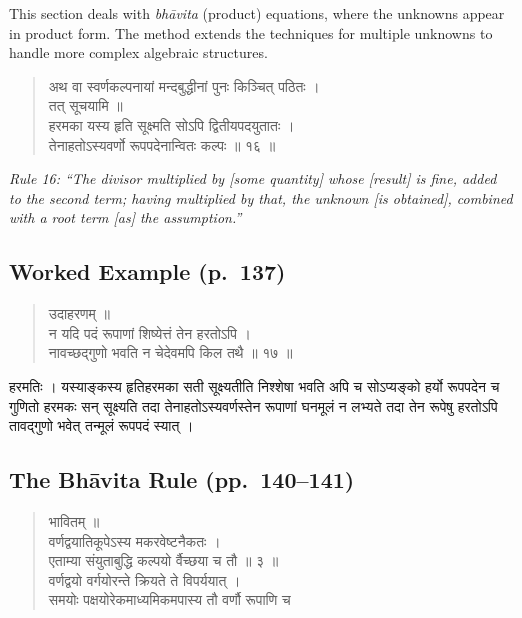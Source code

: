 \documentclass[11pt,a4paper]{article}
\newcommand{\cnote}[1]{\textcolor{notecolor}{\textit{#1}}}
\newcommand{\dev}[1]{{\devanagarifont #1}}
\newenvironment{sanskritverse}{%
  \begin{verse}
}{%
  \end{verse}
}
\begin{document}
This section deals with \textit{bhāvita} (product) equations, where the unknowns appear in product form. The method extends the techniques for multiple unknowns to handle more complex algebraic structures.

\begin{sanskritverse}
\dev{%
अथ वा स्वर्णकल्पनायां मन्दबुद्धीनां पुनः किञ्चित् पठितः ।\\
तत् सूचयामि ॥\\[0.5em]
हरमका यस्य हृति सूक्ष्मति सोऽपि द्वितीयपदयुतातः ।\\
तेनाहतोऽस्यवर्णो रूपपदेनान्वितः कल्पः ॥ १६ ॥}
\end{sanskritverse}

\cnote{Rule 16: ``The divisor multiplied by [some quantity] whose [result] is fine, added to the second term; having multiplied by that, the unknown [is obtained], combined with a root term [as] the assumption.''}

\subsection*{Worked Example (p.\ 137)}

\begin{sanskritverse}
\dev{%
उदाहरणम् ॥\\[0.3em]
न यदि पदं रूपाणां शिष्येत्तं तेन हरतोऽपि ।\\
नावच्छद्‌गुणो भवति न चेदेवमपि किल तथै ॥ १७ ॥}
\end{sanskritverse}

\dev{%
हरमतिः । यस्याङ्कस्य हृतिहरमका सती सूक्ष्यतीति निश्शेषा भवति अपि च सोऽप्यङ्को हर्यो रूपपदेन च गुणितो हरमकः सन् सूक्ष्यति तदा तेनाहतोऽस्यवर्णस्तेन रूपाणां घनमूलं न लभ्यते तदा तेन रूपेषु हरतोऽपि तावद्‌गुणो भवेत् तन्मूलं रूपपदं स्यात् ।}

\subsection{The Bhāvita Rule (pp.\ 140--141)}

\begin{sanskritverse}
\dev{%
भावितम् ॥\\[0.5em]
वर्णद्वयातिकूपेऽस्य मकरवेष्टनैकतः ।\\
एताम्या संयुताबुद्धि कल्पयो र्वैच्छया च तौ ॥ ३ ॥\\[0.5em]
वर्णद्वयो वर्गयोरन्ते क्रियते ते विपर्ययात् ।\\
समयोः पक्षयोरेकमाध्यमिकमपास्य तौ वर्णौ रूपाणि च}
\end{sanskritverse}
\end{document}
